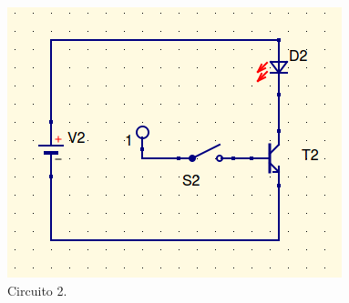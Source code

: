 \documentclass{article}
\begin{document}
\begin{itemize}
\begin{figure}[hptp]
    \centering
    \includegraphics[scale=0.35]{circuito2.png}
    \caption{Circuito 2.}
    \label{2}
\end{figure}
\smallskip

\end{itemize}

%
\end{document}
